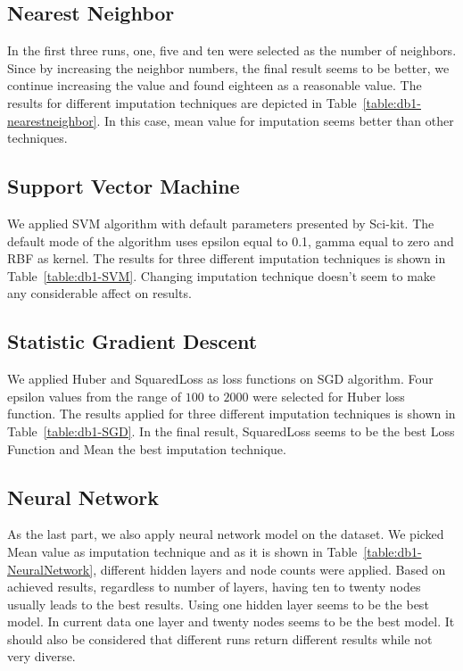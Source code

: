 \subsection{Nearest Neighbor}
In the first three runs, one, five and ten were selected as the number of neighbors. Since by increasing the neighbor numbers, the final result seems to be better, we continue increasing the value and found eighteen as a reasonable value. The results for different imputation techniques are depicted in Table~\ref{table:db1-nearestneighbor}. In this case, mean value for imputation seems better than other techniques.

\subsection{Support Vector Machine}
We applied SVM algorithm with default parameters presented by Sci-kit. The default mode of the algorithm uses epsilon equal to 0.1, gamma equal to zero and RBF as kernel. The results for three different imputation techniques is shown in Table~\ref{table:db1-SVM}. Changing imputation technique doesn't seem to make any considerable affect on results.

\subsection{Statistic Gradient Descent}
We applied Huber and SquaredLoss as loss functions on SGD algorithm. Four epsilon values from the range of $100$ to $2000$ were selected for Huber loss function. The results applied for three different imputation techniques is shown in Table~\ref{table:db1-SGD}. In the final result, SquaredLoss seems to be the best Loss Function and Mean the best imputation technique.

\subsection{Neural Network}
As the last part, we also apply neural network model on the dataset. We picked Mean value as imputation technique and as it is shown in Table~\ref{table:db1-NeuralNetwork}, different hidden layers and node counts were applied. Based on achieved results, regardless to number of layers, having ten to twenty nodes usually leads to the best results. Using one hidden layer seems to be the best model. In current data one layer and twenty nodes seems to be the best model. It should also be considered that different runs return different results while not very diverse.

